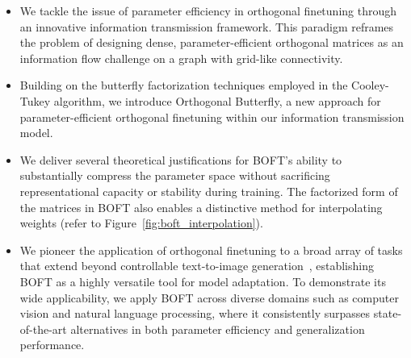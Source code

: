 \begin{itemize}[leftmargin=*,nosep]
    \item We tackle the issue of parameter efficiency in orthogonal finetuning through an innovative information transmission framework. This paradigm reframes the problem of designing dense, parameter-efficient orthogonal matrices as an information flow challenge on a graph with grid-like connectivity.
    \item Building on the butterfly factorization techniques employed in the Cooley-Tukey algorithm, we introduce Orthogonal Butterfly, a new approach for parameter-efficient orthogonal finetuning within our information transmission model.
    \item We deliver several theoretical justifications for BOFT's ability to substantially compress the parameter space without sacrificing representational capacity or stability during training. The factorized form of the matrices in BOFT also enables a distinctive method for interpolating weights (refer to Figure~\ref{fig:boft_interpolation}).
    \item We pioneer the application of orthogonal finetuning to a broad array of tasks that extend beyond controllable text-to-image generation~\cite{qiu2023controlling}, establishing BOFT as a highly versatile tool for model adaptation. To demonstrate its wide applicability, we apply BOFT across diverse domains such as computer vision and natural language processing, where it consistently surpasses state-of-the-art alternatives in both parameter efficiency and generalization performance.
\end{itemize}


\begin{abstract}
The widespread adoption of large foundation models is hindered by the substantial computational cost associated with training them from the ground up. Therefore, developing approaches that can effectively and efficiently tailor these large models to new tasks has become essential. This work focuses on Orthogonal Finetuning (OFT), a theoretically motivated strategy for adapting models to downstream applications. Although OFT offers promising generalization, it is hampered by the significant number of trainable parameters resulting from the dimensionality of orthogonal matrices. To mitigate this limitation, we re-examine OFT through the perspective of information transfer, leading to the formulation of several criteria for achieving improved parameter-efficiency. Drawing inspiration from the Cooley-Tukey fast Fourier transform’s capacity for efficient information flow, we introduce a compact orthogonal parameterization using butterfly structures. By integrating this structure into OFT, we present Orthogonal Butterfly~(BOFT), a new finetuning technique that achieves parameter-efficiency while generalizing OFT as a special instance. We evaluate the effectiveness of BOFT through comprehensive empirical experiments, demonstrating its utility in adapting large-scale vision transformers, language models, and text-to-image diffusion models to an array of vision and language tasks.
\end{abstract}


